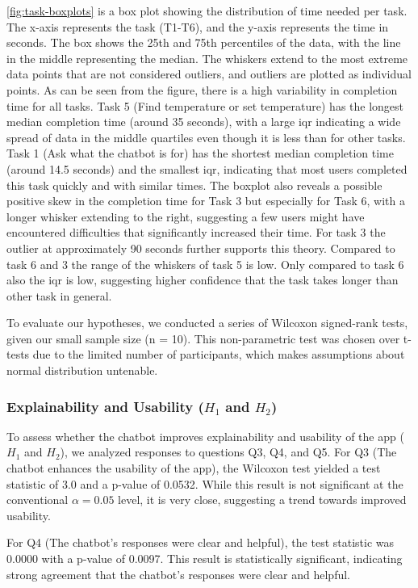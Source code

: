 \cref{fig:task-boxplots} is a box plot showing the distribution of time needed per task. The x-axis represents the task (T1-T6), and the y-axis represents the time in seconds. The box shows the 25th and 75th percentiles of the data, with the line in the middle representing the median. The whiskers extend to the most extreme data points that are not considered outliers, and outliers are plotted as individual points. As can be seen from the figure, there is a high variability in completion time for all tasks. Task 5 (Find temperature or set temperature) has the longest median completion time (around 35 seconds), with a large \gls{iqr}  indicating a wide spread of data in the middle quartiles even though it is less than for other tasks. Task 1 (Ask what the chatbot is for) has the shortest median completion time (around 14.5 seconds) and the smallest \gls{iqr}, indicating that most users completed this task quickly and with similar times.
The boxplot also reveals a possible positive skew in the completion time for Task 3 but especially for Task 6, with a longer whisker extending to the right, suggesting a few users might have encountered difficulties that significantly increased their time.
For task 3 the outlier at approximately 90 seconds further supports this theory.
Compared to task 6 and 3 the range of the whiskers of task 5 is low. Only compared to task 6 also the \gls{iqr} is low, suggesting higher confidence that the task takes longer than other task in general.

To evaluate our hypotheses, we conducted a series of Wilcoxon signed-rank tests, given our small sample size (n = 10). This non-parametric test was chosen over t-tests due to the limited number of participants, which makes assumptions about normal distribution untenable.
\subsubsection{Explainability and Usability (\(H_1\) and \(H_2\))}
To assess whether the chatbot improves explainability and usability of the app (\(H_1\) and \(H_2\)), we analyzed responses to questions Q3, Q4, and Q5.
For Q3 (The chatbot enhances the usability of the app), the Wilcoxon test yielded a test statistic of 3.0 and a p-value of 0.0532. While this result is not significant at the conventional $\alpha = 0.05$ level, it is very close, suggesting a trend towards improved usability.

For Q4 (The chatbot's responses were clear and helpful), the test statistic was 0.0000 with a p-value of 0.0097. This result is statistically significant, indicating strong agreement that the chatbot's responses were clear and helpful.

